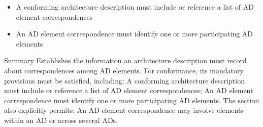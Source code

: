 \documentclass[10pt,letterpaper]{article}
\begin{document}
\begin{CornellNotesTable}
{\begin{itemize}[leftmargin=*,nosep,topsep=1pt]
\item A conforming architecture description must include or reference a list of AD element correspondences
\item An AD element correspondence must identify one or more participating AD elements
\end{itemize}}
\end{CornellNotesTable}


\begin{CornellSummaryBox}{Summary}
Establishes the information an architecture description must record about correspondences among AD elements. For conformance, its mandatory provisions must be satisfied, including: A conforming architecture description must include or reference a list of AD element correspondences; An AD element correspondence must identify one or more participating AD elements. The section also explicitly permits: An AD element correspondence may involve elements within an AD or across several ADs.
\end{CornellSummaryBox}
\end{document}
